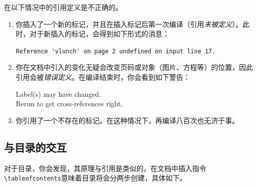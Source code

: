在以下情况中的引用定义是不正确的。

\begin{enumerate}
  \item 你插入了一个新的标记，并且在插入标记后第一次编译（引用\emph{未被定义}）。此时，对于新插入的标记，会得到如下形式的消息：
  
  \begin{dmd}
  \verb|Reference 'vlunch' on page 2 undefined on input line 17.|
  \end{dmd}

  \item 你在文档中引入的变化无疑会改变页码或对象（图片、方程等）的位置，因此引用会被\emph{错误定义}。在编译结束时，你会看到如下警告：
  
  \begin{dmd}
  Label(s) may have changed.\\
  Rerun to get cross-references right.
  \end{dmd}

  \item 你引用了一个不存在的标记。在这种情况下，再编译八百次也无济于事。
\end{enumerate}

\subsection{与目录的交互}

对于目录，你会发现，其原理与引用是类似的。在文档中插入指令\verb|\tableofcontents|意味着目录将会分两步创建，具体如下。

